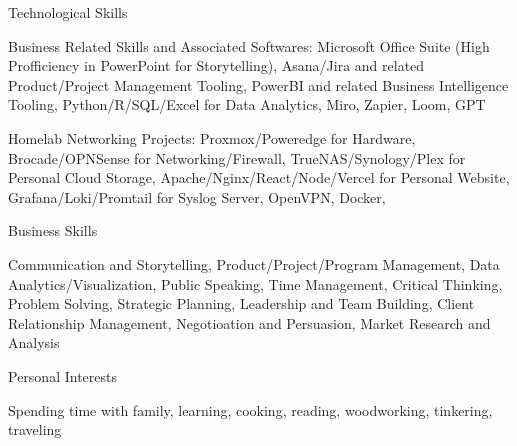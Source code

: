 

\begin{cventries}

  \cventry
    {Technological Skills} %
    {} %
    {} %
    {} %
    {
      \begin{cvitems} %
        \item {Business Related Skills and Associated Softwares: Microsoft Office Suite (High Profficiency in PowerPoint for Storytelling), Asana/Jira and related Product/Project Management Tooling, PowerBI and related Business Intelligence Tooling, Python/R/SQL/Excel for Data Analytics, Miro, Zapier, Loom, GPT}
        \item {Homelab Networking Projects: Proxmox/Poweredge for Hardware, Brocade/OPNSense for Networking/Firewall, TrueNAS/Synology/Plex for Personal Cloud Storage, Apache/Nginx/React/Node/Vercel for Personal Website, Grafana/Loki/Promtail for Syslog Server, OpenVPN, Docker, }
      \end{cvitems}
    }

  \cventry
    {Business Skills} %
    {} %
    {} %
    {} %
    {
      \begin{cvitems} %
        \item {Communication and Storytelling, Product/Project/Program Management, Data Analytics/Visualization, Public Speaking, Time Management, Critical Thinking, Problem Solving, Strategic Planning, Leadership and Team Building, Client Relationship Management, Negotioation and Persuasion, Market Research and Analysis}
      \end{cvitems}
    }

  \cventry
    {Personal Interests} %
    {} %
    {} %
    {} %
    {
      \begin{cvitems} %
        \item {Spending time with family, learning, cooking, reading, woodworking, tinkering, traveling}
      \end{cvitems}
    }

\end{cventries}
